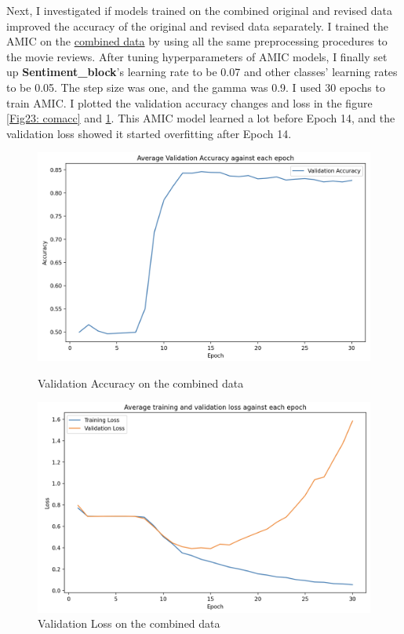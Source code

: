 \documentclass[aoas]{imsart}
\numberwithin{equation}{section}
\theoremstyle{plain}
\theoremstyle{remark}
\begin{document}
Next, I investigated if models trained on the combined original and revised data improved the accuracy of the original and revised data separately. I trained the AMIC on the \href{https://github.com/acmi-lab/counterfactually-augmented-data/tree/master/sentiment/combined/paired}{combined data} by using all the same preprocessing procedures to the movie reviews. After tuning hyperparameters of AMIC models, I finally set up \textbf{Sentiment\_block}'s learning rate to be 0.07 and other classes' learning rates to be 0.05. The step size was one, and the gamma was 0.9. I used 30 epochs to train AMIC. I plotted the validation accuracy changes and loss in the figure \ref{Fig23: comacc} and \ref{Fig24: comloss}. This AMIC model learned a lot before Epoch 14, and the validation loss showed it started overfitting after Epoch 14.
\begin{figure}[ht]
    \centering
    \begin{minipage}{0.45\textwidth}
        \centering
        \includegraphics[width=\textwidth]{img/com_acc.png}
        \caption{Validation Accuracy on the combined data}
        \label{Fig23: comacc}
    \end{minipage}
    \hfill
    \begin{minipage}{0.45\textwidth}
        \centering
        \includegraphics[width=\textwidth]{img/com_loss.png}
        \caption{Validation Loss on the combined data}
        \label{Fig24: comloss}
    \end{minipage}
\end{figure}
\end{document}
